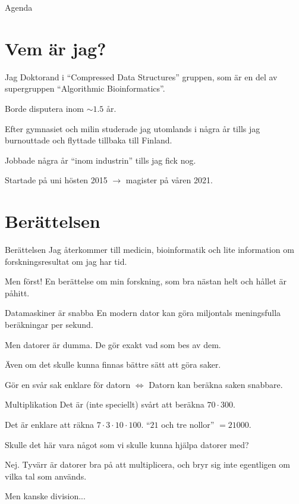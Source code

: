 \documentclass[11pt, aspectratio=169, table]{beamer}
\begin{document}

\begin{frame}{Agenda}
\setlength\parskip{\fill}
\tableofcontents
\end{frame}

\section{Vem är jag?}
\begin{frame}{Jag}
\setlength{\parskip}{\fill}
Doktorand i ``Compressed Data Structures'' gruppen, som är en del av supergruppen ``Algorithmic Bioinformatics''.

Borde disputera inom $\sim 1.5$ år.

Efter gymnasiet och milin studerade jag utomlands i några år tills jag burnouttade och flyttade tillbaka till Finland.

Jobbade några år ``inom industrin'' tills jag fick nog.

Startade på uni hösten 2015 $\to$ magister på våren 2021.
\end{frame}

\section{Berättelsen}
\begin{frame}{Berättelsen}
\setlength{\parskip}{\fill}
Jag återkommer till medicin, bioinformatik och lite information om forskningsresultat om jag har tid.

Men först! En berättelse om min forskning, som bra nästan helt och hållet är påhitt.
\end{frame}

\begin{frame}{Datamaskiner är snabba}
\setlength{\parskip}{\fill}
En modern dator kan göra miljontals meningsfulla beräkningar per sekund.

Men datorer är dumma. De gör \alert{exakt} vad som bes av dem. 

Även om det skulle kunna finnas bättre sätt att göra saker.

Gör en svår sak enklare för datorn $\Leftrightarrow$ Datorn kan beräkna saken snabbare.
\end{frame}

\begin{frame}{Multiplikation}
\setlength{\parskip}{\fill}
Det är (inte speciellt) svårt att beräkna $70 \cdot 300$.

Det är enklare att räkna $7 \cdot 3 \cdot 10 \cdot 100$. ``$21$ och tre nollor'' $= 21000$.

Skulle det här vara något som vi skulle kunna hjälpa datorer med?

\pause
Nej. Tyvärr är datorer bra på att multiplicera, och bryr sig inte egentligen om vilka tal som används.

\pause
Men kanske division...
\end{frame}
\end{document}
